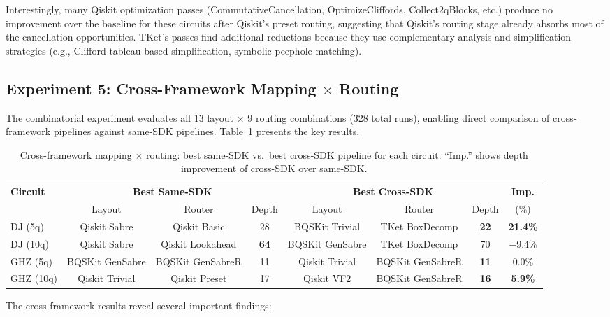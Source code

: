 \documentclass[conference]{IEEEtran}
\begin{document}
Interestingly, many Qiskit optimization passes (CommutativeCancellation, OptimizeCliffords, Collect2qBlocks, etc.) produce no improvement over the baseline for these circuits after Qiskit's preset routing, suggesting that Qiskit's routing stage already absorbs most of the cancellation opportunities. TKet's passes find additional reductions because they use complementary analysis and simplification strategies (e.g., Clifford tableau-based simplification, symbolic peephole matching).

\subsection{Experiment 5: Cross-Framework Mapping $\times$ Routing}

The combinatorial experiment evaluates all 13 layout $\times$ 9 routing combinations (328 total runs), enabling direct comparison of cross-framework pipelines against same-SDK pipelines. Table~\ref{tab:cross} presents the key results.

\begin{table}[t]
\centering
\caption{Cross-framework mapping $\times$ routing: best same-SDK vs.\ best cross-SDK pipeline for each circuit. ``Imp.'' shows depth improvement of cross-SDK over same-SDK.}
\label{tab:cross}
\begin{tabular}{lccccccc}
\toprule
\multirow{2}{*}{\textbf{Circuit}} &
  \multicolumn{3}{c}{\textbf{Best Same-SDK}} &
  \multicolumn{3}{c}{\textbf{Best Cross-SDK}} &
  \textbf{Imp.} \\
\cmidrule(lr){2-4}\cmidrule(lr){5-7}
 & Layout & Router & Depth &Layout & Router & Depth & (\%) \\
\midrule
DJ (5q)  & Qiskit Sabre & Qiskit Basic & 28 & BQSKit Trivial & TKet BoxDecomp & \textbf{22} & \textbf{21.4\%} \\
DJ (10q) & Qiskit Sabre & Qiskit Lookahead & \textbf{64} & BQSKit GenSabre & TKet BoxDecomp & 70 & $-$9.4\% \\
GHZ (5q) & BQSKit GenSabre & BQSKit GenSabreR & 11 & Qiskit Trivial & BQSKit GenSabreR & \textbf{11} & 0.0\% \\
GHZ (10q) & Qiskit Trivial & Qiskit Preset & 17 & Qiskit VF2 & BQSKit GenSabreR & \textbf{16} & \textbf{5.9\%} \\
\bottomrule
\end{tabular}
\end{table}

The cross-framework results reveal several important findings:
\end{document}
